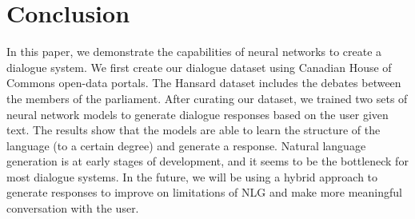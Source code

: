 \section{Conclusion}
In this paper, we demonstrate the capabilities of neural networks to create a dialogue system. We first create our dialogue dataset using Canadian House of Commons open-data portals. The Hansard dataset includes the debates between the members of the parliament. After curating our dataset, we trained two sets of neural network models to generate dialogue responses based on the user given text. The results show that the models are able to learn the structure of the language (to a certain degree) and generate a response. Natural language generation is at early stages of development, and it seems to be the bottleneck for most dialogue systems. In the future, we will be using a hybrid approach to generate responses to improve on limitations of NLG and make more meaningful conversation with the user.